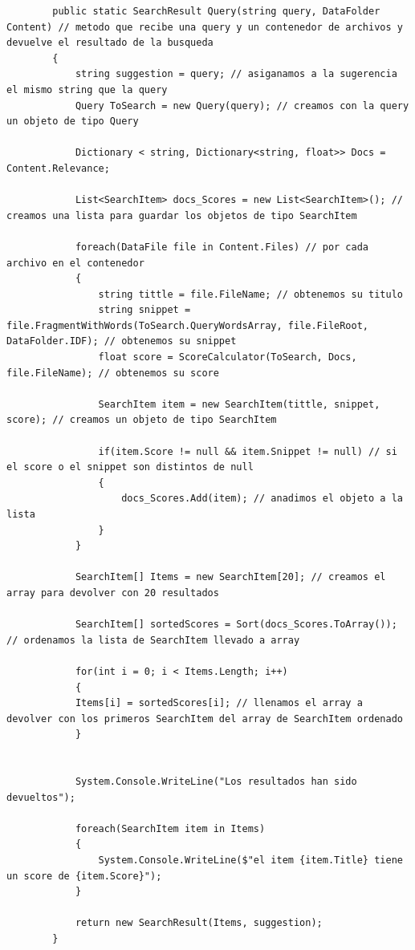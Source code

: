 \documentclass[12pt,a4paper]{report}
\begin{document}
\begin{lstlisting}
        public static SearchResult Query(string query, DataFolder Content) // metodo que recibe una query y un contenedor de archivos y devuelve el resultado de la busqueda
        {   
            string suggestion = query; // asiganamos a la sugerencia el mismo string que la query 
            Query ToSearch = new Query(query); // creamos con la query un objeto de tipo Query

            Dictionary < string, Dictionary<string, float>> Docs = Content.Relevance;

            List<SearchItem> docs_Scores = new List<SearchItem>(); // creamos una lista para guardar los objetos de tipo SearchItem
            
            foreach(DataFile file in Content.Files) // por cada archivo en el contenedor
            {
                string tittle = file.FileName; // obtenemos su titulo
                string snippet = file.FragmentWithWords(ToSearch.QueryWordsArray, file.FileRoot, DataFolder.IDF); // obtenemos su snippet
                float score = ScoreCalculator(ToSearch, Docs, file.FileName); // obtenemos su score

                SearchItem item = new SearchItem(tittle, snippet, score); // creamos un objeto de tipo SearchItem

                if(item.Score != null && item.Snippet != null) // si el score o el snippet son distintos de null
                {
                    docs_Scores.Add(item); // anadimos el objeto a la lista 
                }
            }
    	    
            SearchItem[] Items = new SearchItem[20]; // creamos el array para devolver con 20 resultados

            SearchItem[] sortedScores = Sort(docs_Scores.ToArray()); // ordenamos la lista de SearchItem llevado a array 

            for(int i = 0; i < Items.Length; i++)
            {
            Items[i] = sortedScores[i]; // llenamos el array a devolver con los primeros SearchItem del array de SearchItem ordenado
            }
            

            System.Console.WriteLine("Los resultados han sido devueltos");

            foreach(SearchItem item in Items)
            {
                System.Console.WriteLine($"el item {item.Title} tiene un score de {item.Score}");
            }

            return new SearchResult(Items, suggestion);
        }

\end{lstlisting}
\end{document}
